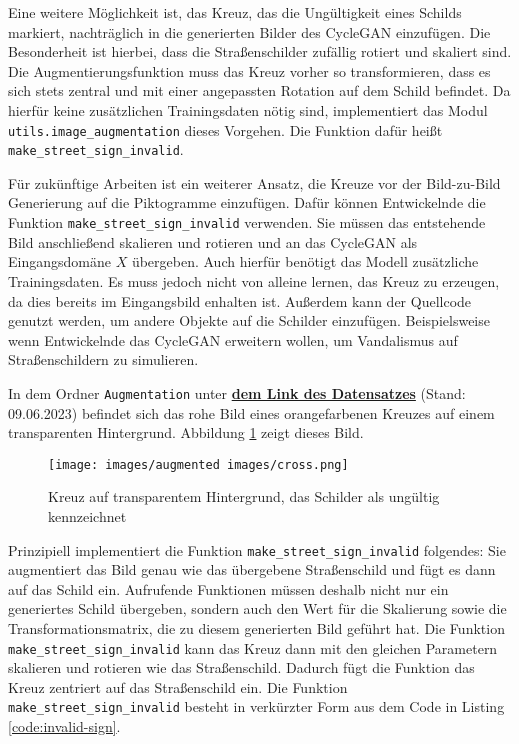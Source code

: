 Eine weitere Möglichkeit ist, das Kreuz, das die Ungültigkeit eines Schilds markiert, nachträglich in die generierten Bilder des \ac{CycleGAN} einzufügen. Die Besonderheit ist hierbei, dass die Straßenschilder zufällig rotiert und skaliert sind. Die Augmentierungsfunktion muss das Kreuz vorher so transformieren, dass es sich stets zentral und mit einer angepassten Rotation auf dem Schild befindet. Da hierfür keine zusätzlichen Trainingsdaten nötig sind, implementiert das Modul  \texttt{utils.image_augmentation} dieses Vorgehen. Die Funktion dafür heißt \texttt{make_street_sign_invalid}. 

Für zukünftige Arbeiten ist ein weiterer Ansatz, die Kreuze vor der Bild-zu-Bild Generierung auf die Piktogramme einzufügen. Dafür können Entwickelnde die Funktion \texttt{make_street_sign_invalid} verwenden. Sie müssen das entstehende Bild anschließend skalieren und rotieren und an das \ac{CycleGAN} als Eingangsdomäne $X$ übergeben. Auch hierfür benötigt das Modell zusätzliche Trainingsdaten. Es muss jedoch nicht von alleine lernen, das Kreuz zu erzeugen, da dies bereits im Eingangsbild enhalten ist. Außerdem kann der Quellcode genutzt werden, um andere Objekte auf die Schilder einzufügen. Beispielsweise wenn Entwickelnde das \ac{CycleGAN} erweitern wollen, um Vandalismus auf Straßenschildern zu simulieren.

In dem Ordner \texttt{Augmentation} unter \href{https://drive.google.com/drive/u/1/folders/1310Eb5WDgaszu47k6V8St5m-QtQV1Ocg}{\textbf{dem Link des Datensatzes}} (Stand: 09.06.2023) befindet sich das rohe Bild eines orangefarbenen Kreuzes auf einem transparenten Hintergrund. Abbildung \ref{fig:cross} zeigt dieses Bild.
\begin{figure}[h]
	\centering
	\texttt{[image: images/augmented images/cross.png]}
	\caption{Kreuz auf transparentem Hintergrund, das Schilder als ungültig kennzeichnet}
	\label{fig:cross}
\end{figure} 
Prinzipiell implementiert die Funktion \texttt{make_street_sign_invalid} folgendes: Sie augmentiert das Bild genau wie das übergebene Straßenschild und fügt es dann auf das Schild ein. Aufrufende Funktionen müssen deshalb nicht nur ein generiertes Schild übergeben, sondern auch den Wert für die Skalierung sowie die Transformationsmatrix, die zu diesem generierten Bild geführt hat. Die Funktion \texttt{make_street_sign_invalid} kann das Kreuz dann mit den gleichen Parametern skalieren und rotieren wie das Straßenschild. Dadurch fügt die Funktion das Kreuz zentriert auf das Straßenschild ein. Die Funktion \texttt{make_street_sign_invalid} besteht in verkürzter Form aus dem Code in Listing \ref{code:invalid-sign}.

